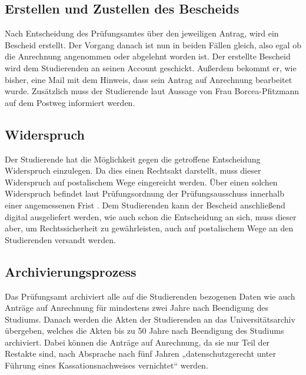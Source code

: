 \subsection{Erstellen und Zustellen des Bescheids}
Nach Entscheidung des Prüfungsamtes über den jeweiligen Antrag, wird ein Bescheid erstellt. Der Vorgang danach ist nun in beiden Fällen gleich, also egal ob die Anrechnung angenommen oder abgelehnt worden ist. Der erstellte Bescheid wird dem Studierenden an seinen Account geschickt. Außerdem bekommt er, wie bisher, eine Mail mit dem Hinweis, dass sein Antrag auf Anrechnung bearbeitet wurde. Zusätzlich muss der Studierende laut Aussage von Frau Borcea-Pfitzmann auf dem Postweg informiert werden.

\subsection{Widerspruch}
Der Studierende hat die Möglichkeit gegen die getroffene Entscheidung Widerspruch einzulegen. Da dies einen Rechtsakt darstellt, muss dieser Widerspruch auf postalischem Wege eingereicht werden. Über einen solchen Widerspruch befindet laut Prüfungsordnung der Prüfungsausschuss innerhalb einer angemessenen Frist \parencite{pruefungsordnung_ba}. Dem Studierenden kann der Bescheid anschließend digital ausgeliefert werden, wie auch schon die Entscheidung an sich, muss dieser aber, um Rechtssicherheit zu gewährleisten, auch auf postalischem Wege an den Studierenden versandt werden.

\subsection{Archivierungsprozess}
Das Prüfungsamt archiviert alle auf die Studierenden bezogenen Daten wie auch Anträge auf Anrechnung für mindestens zwei Jahre nach Beendigung des Studiums. Danach werden die Akten der Studierenden an das Universitätsarchiv übergeben, welches die Akten bis zu 50 Jahre nach Beendigung des Studiums archiviert. Dabei können die Anträge auf Anrechnung, da sie nur Teil der Restakte sind, nach Absprache nach fünf Jahren „datenschutzgerecht unter Führung eines Kassationsnachweises vernichtet“ \parencite{archivierung} werden.


